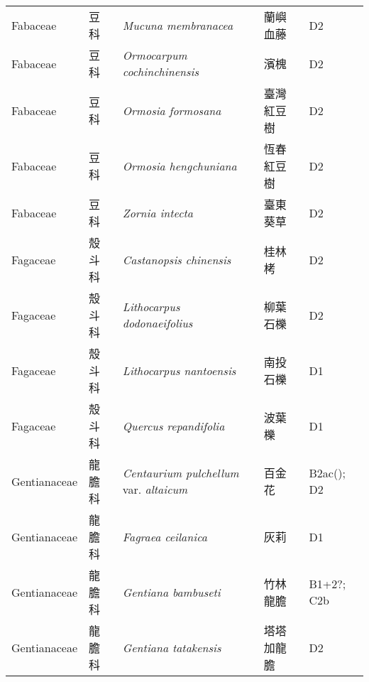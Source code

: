 {\begin{longtable}{p{2.5cm}p{2.5cm}p{4.5cm}p{2.5cm}p{3cm}}
    Fabaceae & 豆科 & \textit{Mucuna membranacea}  & 蘭嶼血藤 & D2 \index{Mucuna@\textit{Mucuna}!membranacea@\textit{membranacea}}  \index{蘭嶼血藤} \\
    Fabaceae & 豆科 & \textit{Ormocarpum cochinchinensis}  & 濱槐 & D2 \index{Ormocarpum@\textit{Ormocarpum}!cochinchinensis@\textit{cochinchinensis}}  \index{濱槐} \\
    Fabaceae & 豆科 & \textit{Ormosia formosana}  & 臺灣紅豆樹 & D2 \index{Ormosia@\textit{Ormosia}!formosana@\textit{formosana}}  \index{臺灣紅豆樹} \\
    Fabaceae & 豆科 & \textit{Ormosia hengchuniana}  & 恆春紅豆樹 & D2 \index{Ormosia@\textit{Ormosia}!hengchuniana@\textit{hengchuniana}}  \index{恆春紅豆樹} \\
    Fabaceae & 豆科 & \textit{Zornia intecta}  & 臺東葵草 & D2 \index{Zornia@\textit{Zornia}!intecta@\textit{intecta}}  \index{臺東葵草} \\
    Fagaceae & 殼斗科 & \textit{Castanopsis chinensis}  & 桂林栲 & D2 \index{Castanopsis@\textit{Castanopsis}!chinensis@\textit{chinensis}}  \index{桂林栲} \\
    Fagaceae & 殼斗科 & \textit{Lithocarpus dodonaeifolius}  & 柳葉石櫟 & D2 \index{Lithocarpus@\textit{Lithocarpus}!dodonaeifolius@\textit{dodonaeifolius}}  \index{柳葉石櫟} \\
    Fagaceae & 殼斗科 & \textit{Lithocarpus nantoensis}  & 南投石櫟 & D1 \index{Lithocarpus@\textit{Lithocarpus}!nantoensis@\textit{nantoensis}}  \index{南投石櫟} \\
    Fagaceae & 殼斗科 & \textit{Quercus repandifolia}  & 波葉櫟 & D1 \index{Quercus@\textit{Quercus}!repandifolia@\textit{repandifolia}}  \index{波葉櫟} \\
    Gentianaceae & 龍膽科 & \textit{Centaurium pulchellum} var. \textit{altaicum}  & 百金花 & B2ac(); D2 \index{Centaurium@\textit{Centaurium}!pulchellum@\textit{pulchellum}!var. altaicum@var. \textit{altaicum}}  \index{百金花} \\
    Gentianaceae & 龍膽科 & \textit{Fagraea ceilanica}  & 灰莉 & D1 \index{Fagraea@\textit{Fagraea}!ceilanica@\textit{ceilanica}}  \index{灰莉} \\
    Gentianaceae & 龍膽科 & \textit{Gentiana bambuseti}  & 竹林龍膽 & B1+2?; C2b \index{Gentiana@\textit{Gentiana}!bambuseti@\textit{bambuseti}}  \index{竹林龍膽} \\
    Gentianaceae & 龍膽科 & \textit{Gentiana tatakensis}  & 塔塔加龍膽 & D2 \index{Gentiana@\textit{Gentiana}!tatakensis@\textit{tatakensis}}  \index{塔塔加龍膽} \\

\end{longtable}}
